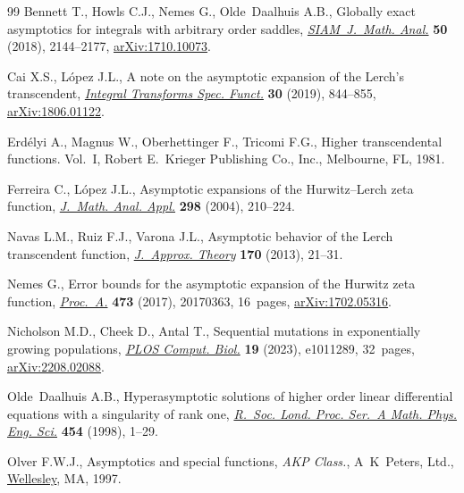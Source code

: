 \documentclass[11pt]{article}
\numberwithin{equation}{section}
\numberwithin{equation}{section}
\begin{document}
\begin{thebibliography}{99}
Bennett T., Howls C.J., Nemes G., Olde~Daalhuis A.B., Globally exact
 asymptotics for integrals with arbitrary order saddles, \href{https://doi.org/10.1137/17M1154217}{\textit{SIAM~J.~Math.
 Anal.}} \textbf{50} (2018), 2144--2177, \href{https://arxiv.org/abs/1710.10073}{arXiv:1710.10073}.

Cai X.S., L\'opez J.L., A note on the asymptotic expansion of the {L}erch's
 transcendent, \href{https://doi.org/10.1080/10652469.2019.1627530}{\textit{Integral Transforms Spec. Funct.}} \textbf{30} (2019),
 844--855, \href{https://arxiv.org/abs/1806.01122}{arXiv:1806.01122}.

Erd\'elyi A., Magnus W., Oberhettinger F., Tricomi F.G., Higher transcendental
 functions. {V}ol.~{I}, Robert E.~Krieger Publishing Co., Inc., Melbourne, FL,
 1981.

Ferreira C., L\'opez J.L., Asymptotic expansions of the {H}urwitz--{L}erch zeta
 function, \href{https://doi.org/10.1016/j.jmaa.2004.05.040}{\textit{J.~Math. Anal. Appl.}} \textbf{298} (2004), 210--224.

Navas L.M., Ruiz F.J., Varona J.L., Asymptotic behavior of the {L}erch
 transcendent function, \href{https://doi.org/10.1016/j.jat.2012.03.006}{\textit{J.~Approx. Theory}} \textbf{170} (2013),
 21--31.

Nemes G., Error bounds for the asymptotic expansion of the {H}urwitz zeta
 function, \href{https://doi.org/10.1098/rspa.2017.0363}{\textit{Proc.~A.}} \textbf{473} (2017), 20170363, 16~pages,
 \href{https://arxiv.org/abs/1702.05316}{arXiv:1702.05316}.

Nicholson M.D., Cheek D., Antal T., Sequential mutations in exponentially
 growing populations, \href{https://doi.org/10.1371/journal.pcbi.1011289}{\textit{PLOS Comput. Biol.}} \textbf{19} (2023),
 e1011289, 32~pages, \href{https://arxiv.org/abs/2208.02088}{arXiv:2208.02088}.

Olde~Daalhuis A.B., Hyperasymptotic solutions of higher order linear
 differential equations with a singularity of rank one, \href{https://doi.org/10.1098/rspa.1998.0145}{\textit{R.~Soc. Lond.
 Proc. Ser.~A Math. Phys. Eng. Sci.}} \textbf{454} (1998), 1--29.

Olver F.W.J., Asymptotics and special functions, \textit{AKP Class.}, A~K~Peters, Ltd.,
 \href{https://doi.org/10.1201/9781439864548}{Wellesley}, MA, 1997.


\end{thebibliography}
\end{document}
